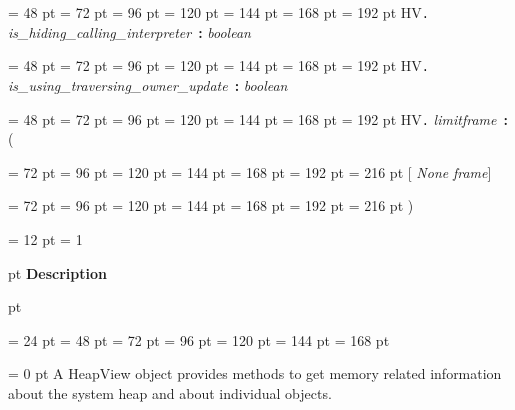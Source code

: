 {{{{\par \noindent  \leftskip = 48 pt  \leftmargini = 72 pt  \leftmarginii = 96 pt  \leftmarginiii = 120 pt  \leftmarginiv = 144 pt  \leftmarginv = 168 pt  \leftmarginvi = 192 pt HV{\large {\tt .\/} {\em is{\_}hiding{\_}calling{\_}interpreter\/}}~{\bf :}  {\em boolean\/}\par}
{\par \noindent  \leftskip = 48 pt  \leftmargini = 72 pt  \leftmarginii = 96 pt  \leftmarginiii = 120 pt  \leftmarginiv = 144 pt  \leftmarginv = 168 pt  \leftmarginvi = 192 pt HV{\large {\tt .\/} {\em is{\_}using{\_}traversing{\_}owner{\_}update\/}}~{\bf :}  {\em boolean\/}\par}
{\par \noindent  \leftskip = 48 pt  \leftmargini = 72 pt  \leftmarginii = 96 pt  \leftmarginiii = 120 pt  \leftmarginiv = 144 pt  \leftmarginv = 168 pt  \leftmarginvi = 192 pt HV{\large {\tt .\/} {\em limitframe\/}}~{\bf :}  ({\par \noindent
{\par \noindent  \leftskip = 72 pt  \leftmargini = 96 pt  \leftmarginii = 120 pt  \leftmarginiii = 144 pt  \leftmarginiv = 168 pt  \leftmarginv = 192 pt  \leftmarginvi = 216 pt {\bf {}\/}{[} {\em None\/}{\bf {}\/} {\em frame\/}]\par}
{\par \noindent  \leftskip = 72 pt  \leftmargini = 96 pt  \leftmarginii = 120 pt  \leftmarginiii = 144 pt  \leftmarginiv = 168 pt  \leftmarginv = 192 pt  \leftmarginvi = 216 pt  )\par}
\par}
\par}
\par}
\par}
{\par \pagebreak[3.300000] \noindent \hangindent = 12 pt \hangafter = 1 
{\par \pagebreak[3]  pt \noindent
{\Large {\bf Description\/}}\par {} pt
} \noindent
\par}
{\par \noindent  \leftskip = 24 pt  \leftmargini = 48 pt  \leftmarginii = 72 pt  \leftmarginiii = 96 pt  \leftmarginiv = 120 pt  \leftmarginv = 144 pt  \leftmarginvi = 168 pt {\par \parindent = 0 pt 
A HeapView object provides methods to get memory related information
about the system heap and about individual objects. 
}}}

